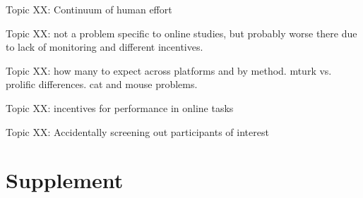 \documentclass[a4paper,notitlepage,12pt]{article}
\begin{document}
Topic XX: Continuum of human effort

Topic XX: not a problem specific to online studies, but probably worse there due to lack of monitoring and different incentives.

Topic XX: how many to expect across platforms and by method. mturk vs. prolific differences. cat and mouse problems.

Topic XX: incentives for performance in online tasks

Topic XX: Accidentally screening out participants of interest

\section{Supplement}


\end{document}
